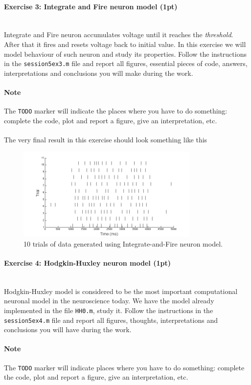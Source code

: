 \documentclass[a4paper,11pt]{article}
\newenvironment{exercise}[3]{\paragraph{Exercise #1: #2 (#3pt)}\ \\}{
\medskip}
\begin{document}
%
%
\begin{exercise}{3}{Integrate and Fire neuron model}{1}
Integrate and Fire neuron accumulates voltage until it reaches the \emph{threshold}. After that it fires and resets voltage back to initial value. In this exercise we will model behaviour of such neuron and study its properties. Follow the instructions in the \texttt{session5ex3.m} file and report all figures, essential pieces of code, answers, interpretations and conclusions you will make during the work.

\paragraph{Note} The \texttt{TODO} marker will indicate the places where you have to do something: complete the code, plot and report a figure, give an interpretation, etc.\\
\ \\
The very final result in this exercise should look something like this
\begin{figure}[H]
   \centering
   \includegraphics[width=0.8\textwidth]{raster_plot.png} 
   \caption{10 trials of data generated using Integrate-and-Fire neuron model.}
   \label{fig:rasterplot}
\end{figure}
\end{exercise}


%
%
\begin{exercise}{4}{Hodgkin-Huxley neuron model}{1}
Hodgkin-Huxley model is considered to be the most important computational neuronal model in the neuroscience today. We have the model already implemented in the file \texttt{HH0.m}, study it. Follow the instructions in the \texttt{session5ex4.m} file and report all figures, thoughts, interpretations and conclusions you will have during the work.

\paragraph{Note} The \texttt{TODO} marker will indicate places where you have to do something: complete the code, plot and report a figure, give an interpretation, etc.
\end{exercise}
\end{document}
